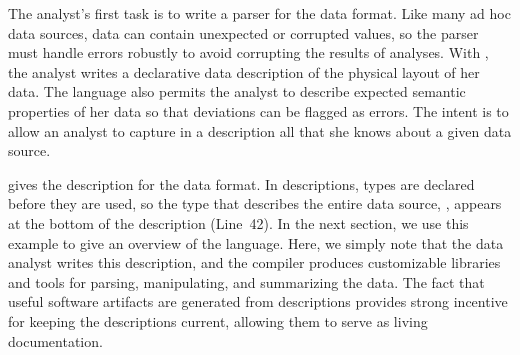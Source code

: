 The analyst's first task is to write a parser for the
\dibbler{} data  format.  Like many ad hoc data sources, \dibbler{} data
can contain unexpected or corrupted values, so the
parser must handle errors robustly to avoid corrupting the results of
analyses.  
With \pads{}, the analyst writes a declarative data description of the
physical layout of her data.  The language also permits the analyst to
describe expected semantic properties of her data so that deviations
can be flagged as errors. The intent is to allow an analyst to capture
in a \pads{} description all that she knows about a given data source.

 gives the \pads{} description for the
\dibbler{} data format.  In \pads{} descriptions, types are declared
before they are used, so the type that describes the entire data
source, , appears at the bottom of the description (Line~42).  In
the next section, we use this example to give an overview of
the \pads{} language.  Here, we simply note that the data analyst
writes this description, and the \pads{} compiler produces
customizable \C{} libraries and tools for parsing, manipulating, and
summarizing the data.  The fact that useful software artifacts are
generated from \pads{} descriptions provides strong incentive for
keeping the descriptions current, allowing them to serve as living
documentation.

